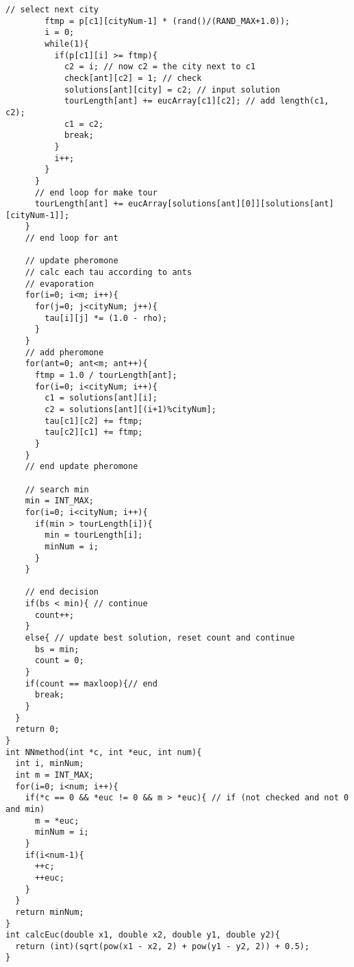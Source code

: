 \documentclass[a4j]{jarticle}
\begin{document}
\begin{lstlisting}[caption=AS.c, label=AS, xleftmargin=1cm]
        // select next city
        ftmp = p[c1][cityNum-1] * (rand()/(RAND_MAX+1.0));
        i = 0;
        while(1){
          if(p[c1][i] >= ftmp){
            c2 = i; // now c2 = the city next to c1
            check[ant][c2] = 1; // check
            solutions[ant][city] = c2; // input solution
            tourLength[ant] += eucArray[c1][c2]; // add length(c1, c2);
            c1 = c2;
            break;
          }
          i++;
        }
      }
      // end loop for make tour
      tourLength[ant] += eucArray[solutions[ant][0]][solutions[ant][cityNum-1]];
    }
    // end loop for ant
    
    // update pheromone
    // calc each tau according to ants
    // evaporation
    for(i=0; i<m; i++){
      for(j=0; j<cityNum; j++){
        tau[i][j] *= (1.0 - rho);
      }
    }
    // add pheromone
    for(ant=0; ant<m; ant++){
      ftmp = 1.0 / tourLength[ant];
      for(i=0; i<cityNum; i++){
        c1 = solutions[ant][i];
        c2 = solutions[ant][(i+1)%cityNum];
        tau[c1][c2] += ftmp;
        tau[c2][c1] += ftmp;
      }
    }
    // end update pheromone

    // search min
    min = INT_MAX;
    for(i=0; i<cityNum; i++){
      if(min > tourLength[i]){
        min = tourLength[i];
        minNum = i;
      }
    }

    // end decision
    if(bs < min){ // continue 
      count++;
    }
    else{ // update best solution, reset count and continue
      bs = min;
      count = 0;
    }
    if(count == maxloop){// end
      break;
    }
  }
  return 0;
}
int NNmethod(int *c, int *euc, int num){
  int i, minNum;
  int m = INT_MAX;
  for(i=0; i<num; i++){
    if(*c == 0 && *euc != 0 && m > *euc){ // if (not checked and not 0 and min)
      m = *euc;
      minNum = i;
    }
    if(i<num-1){
      ++c;
      ++euc;
    }
  }
  return minNum;
}
int calcEuc(double x1, double x2, double y1, double y2){
  return (int)(sqrt(pow(x1 - x2, 2) + pow(y1 - y2, 2)) + 0.5);   
}
\end{lstlisting}
\end{document}
